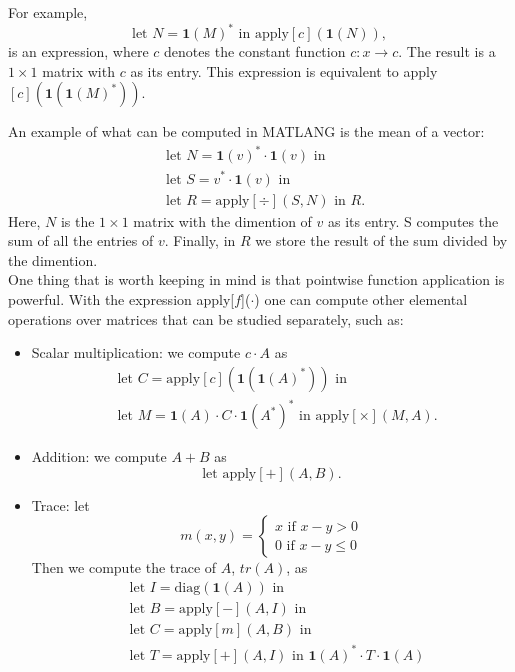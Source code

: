For example, $$\text{let }N=\mathbf{1}(M)^*\text{ in apply}[c](\mathbf{1}(N)),$$ is an expression, where $c$ denotes the constant function $c:x\rightarrow c$. The result is a $1\times 1$ matrix with $c$ as its entry. This expression is equivalent to apply$[c](\mathbf{1}(\mathbf{1}(M)^*))$.

An example of what can be computed in MATLANG is the mean of a vector:
\begin{align*}
	&\text{let }N=\mathbf{1}(v)^*\cdot\mathbf{1}(v)\text{ in} \\
	&\text{let }S=v^*\cdot\mathbf{1}(v)\text{ in} \\
	&\text{let }R=\text{apply}[\div](S, N)\text{ in } R.
\end{align*}
Here, $N$ is the $1\times 1$ matrix with the dimention of $v$ as its entry. S computes the sum of all the entries of $v$. Finally, in $R$ we store the result of the sum divided by the dimention. \\


One thing that is worth keeping in mind is that pointwise function application is powerful. With the expression apply[$f$]($\cdot$) one can compute other elemental operations over matrices that can be studied separately, such as:
\begin{itemize}
	\item Scalar multiplication: we compute $c\cdot A$ as
		\begin{align*}
			&\text{let }C=\text{apply}[c](\mathbf{1}(\mathbf{1}(A)^*))\text{ in} \\
			&\text{let }M=\mathbf{1}(A)\cdot C\cdot\mathbf{1}(A^*)^*\text{ in apply}[\times](M,A).
		\end{align*}
	\item Addition: we compute $A+B$ as $$\text{let apply}[+](A,B).$$
	\item Trace: let 
		\[
  			m(x, y)=\begin{cases}
               x \text{ if } x-y>0 \\
               0 \text{ if }x-y\leq 0
            \end{cases}
		\]
		Then we compute the trace of $A$, $tr(A)$, as
		\begin{align*}
			&\text{let }I=\text{diag}(\mathbf{1}(A))\text{ in} \\
			&\text{let }B=\text{apply}[-](A, I)\text{ in} \\
			&\text{let }C=\text{apply}[m](A,B)\text{ in} \\
			&\text{let }T=\text{apply}[+](A,I)\text{ in } \mathbf{1}(A)^*\cdot T\cdot\mathbf{1}(A)\\
		\end{align*}
\end{itemize}

\label{sec:matlang}